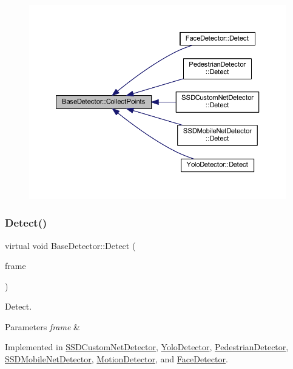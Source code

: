 \begin{figure}[H]
\begin{center}
\leavevmode
\includegraphics[width=350pt]{class_base_detector_a20380b0980c6f262b0829f37fb89d2a7_icgraph}
\end{center}
\end{figure}
\mbox{\label{class_base_detector_a9c9dedfffb7673fd2995f24bdb9ade18}} 
\subsubsection{\texorpdfstring{Detect()}{Detect()}}
{\footnotesize\ttfamily virtual void Base\+Detector\+::\+Detect (\begin{DoxyParamCaption}\item[{cv\+::\+U\+Mat \&}]{frame }\end{DoxyParamCaption})\hspace{0.3cm}{\ttfamily [pure virtual]}}



Detect. 


\begin{DoxyParams}{Parameters}
{\em frame} & \\
\hline
\end{DoxyParams}


Implemented in \mbox{\hyperlink{class_s_s_d_custom_net_detector_abcd14fa695e46fab1eab8ea5524c0ba5}{S\+S\+D\+Custom\+Net\+Detector}}, \mbox{\hyperlink{class_yolo_detector_a4c4232e3198a50666e6b4ed9d00bf42c}{Yolo\+Detector}}, \mbox{\hyperlink{class_pedestrian_detector_a27a7c2c3b358f6e44a7de71f808597c2}{Pedestrian\+Detector}}, \mbox{\hyperlink{class_s_s_d_mobile_net_detector_a6ac3fd479002779642ed185107d83dea}{S\+S\+D\+Mobile\+Net\+Detector}}, \mbox{\hyperlink{class_motion_detector_aac68875ab09d4436391855e2df4e0e06}{Motion\+Detector}}, and \mbox{\hyperlink{class_face_detector_a4b9210a00283d5bf394c6188e3e0ab39}{Face\+Detector}}.

